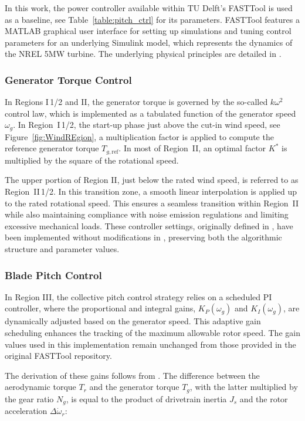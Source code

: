 In this work, the power controller available within TU Delft's FASTTool \cite{mulders2020wind} is used as a baseline, see Table~\ref{table:pitch_ctrl} for its parameters. FASTTool features a MATLAB graphical user interface for setting up simulations and tuning control parameters for an underlying Simulink model, which represents the dynamics of the NREL 5MW turbine. The underlying physical principles are detailed in \cite{jonkman2009definition}. 


\subsubsection{Generator Torque Control}

In Regions I\,1/2 and II, the generator torque is governed by the so-called $k\omega^2$ control law, which is implemented as a tabulated function of the generator speed $\omega_g$. In Region~I\,1/2, the start-up phase just above the cut-in wind speed, see Figure~\ref{fig:WindREgion}, a multiplication factor is applied to compute the reference generator torque $T_{g,\text{ref}}$. In most of Region~II, an optimal factor $K^*$ is multiplied by the square of the rotational speed.

The upper portion of Region II, just below the rated wind speed, is referred to as Region~II\,1/2. In this transition zone, a smooth linear interpolation is applied up to the rated rotational speed. This ensures a seamless transition within Region~II while also maintaining compliance with noise emission regulations and limiting excessive mechanical loads. These controller settings, originally defined in \cite{jonkman2009definition}, have been implemented without modifications in \cite{mulders2020wind}, preserving both the algorithmic structure and parameter values.

\subsubsection{Blade Pitch Control} 

In Region III, the collective pitch control strategy relies on a scheduled PI controller, where the proportional and integral gains, $K_P(\omega_g)$ and $K_I(\omega_g)$, are dynamically adjusted based on the generator speed. This adaptive gain scheduling enhances the tracking of the maximum allowable rotor speed. The gain values used in this implementation remain unchanged from those provided in the original FASTTool repository.

The derivation of these gains follows from \cite{jonkman2009definition}. The difference between the aerodynamic torque $T_r$ and the generator torque $T_g$, with the latter multiplied by the gear ratio $N_g$, is equal to the product of drivetrain inertia $J_{s}$ and the rotor acceleration $\Delta \dot{\omega}_r$:

